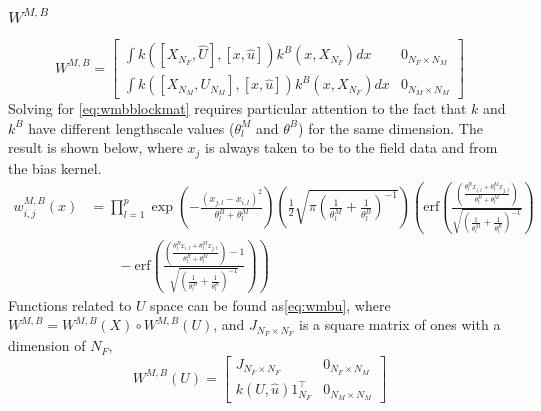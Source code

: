 \documentclass[
]{article}
\begin{document}
\hypertarget{wmb}{%
\subsubsection{\texorpdfstring{\(W^{M,B}\)}{W\^{}\{M,B\}}}\label{wmb}}

\begin{equation}
W^{M,B}  =  \begin{bmatrix}
\int k([X_{N_F}, \hat{U}], [x, \hat{u}])k^B(x, X_{N_F})dx & 0_{N_F \times N_M}\\
\int k([X_{N_M}, U_{N_M}], [x, \hat{u}])k^B(x, X_{N_F})dx & 0_{N_M \times N_M}
\end{bmatrix}
\label{eq:wmbblockmat}
\end{equation}
Solving for \eqref{eq:wmbblockmat} requires particular attention to the fact that \(k\) and \(k^B\) have
different lengthscale values (\(\theta^M_l\) and \(\theta^B\)) for the same dimension. The result is shown below, where \(x_j\) is always taken to be to the field data and from the bias kernel.
\begin{equation}
\begin{split}
w^{M,B}_{i,j}(x) &= \prod_{l = 1}^p \exp \left(-\frac{(x_{j,l}-x_{i,l})^2}{\theta^B_l + \theta_l^M}\right)\left(\frac{1}{2}\sqrt{\pi\left(\frac{1}{\theta_l^M}+\frac{1}{\theta^B_l}\right)^{-1}}\right) \left(\mathrm{erf}\left(\frac{\left(\frac{\theta^B_l x_{i,l} + \theta_l^M x_{j,l}}{\theta^B_l + \theta_l^M}\right)}{\sqrt{\left(\frac{1}{\theta_l^M} + \frac{1}{\theta^B_l}\right)^{-1}}}\right)\right. \\
& \qquad - \left.\mathrm{erf}\left(\frac{\left(\frac{\theta^B_l x_{i,l} + \theta_l^M x_{j,l}}{\theta^B_l + \theta_l^M}\right)-1}{\sqrt{\left(\frac{1}{\theta_l^M} + \frac{1}{\theta^B_l}\right)^{-1}}}\right)\right)
\end{split}
\label{eq:wmbint}
\end{equation}
Functions related to \(U\) space can be found as\eqref{eq:wmbu}, where \(W^{M,B} = W^{M,B}(X) \circ W^{M,B}(U)\), and \(J_{N_F \times N_F}\) is a square matrix of ones with a dimension of \(N_F\),
\begin{equation}
W^{M,B}(U)=
\begin{bmatrix}
J_{N_F \times N_F} & 0_{N_F \times N_M}\\
k(U, \hat{u})1^{\top}_{N_F} & 0_{N_M \times N_M}
\end{bmatrix}
\label{eq:wmbu}
\end{equation}
\end{document}
